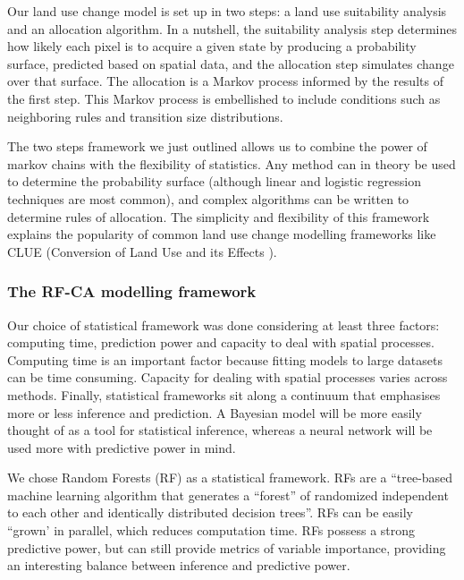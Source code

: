 Our land use change model is set up in two steps: a land use suitability analysis and an allocation algorithm. In a nutshell, the suitability analysis step determines how likely each pixel is to acquire a given state by producing a probability surface, predicted based on spatial data, and the allocation step simulates change over that surface. The allocation is a Markov process informed by the results of the first step. This Markov process is embellished to include conditions such as neighboring rules and transition size distributions.

The two steps framework we just outlined allows us to combine the power of markov chains with the flexibility of statistics. Any method can in theory be used to determine the probability surface (although linear and logistic regression techniques are most common), and complex algorithms can be written to determine rules of allocation. The simplicity and flexibility of this framework explains the popularity of common land use change modelling frameworks like CLUE  (Conversion of Land Use and its Effects \cite{verburg_modeling_2002, verburg_combining_2009}). \\

\subsubsection{The RF-CA modelling framework}

Our choice of statistical framework was done considering at least three factors: computing time, prediction power and capacity to deal with spatial processes. Computing time is an important factor because fitting models to large datasets can be time consuming. Capacity for dealing with spatial processes varies across methods. Finally, statistical frameworks sit along a continuum that emphasises more or less inference and prediction. A Bayesian model will be more easily thought of as a tool for statistical inference, whereas a neural network will be used more with predictive power in mind.

We chose Random Forests (RF) as a statistical framework. RFs are a “tree-based machine learning algorithm that generates a “forest” of randomized independent to each other and identically distributed decision trees”. RFs can be easily “grown’ in parallel, which reduces computation time. RFs possess a strong predictive power, but can still provide metrics of variable importance, providing an interesting balance between inference and predictive power.

